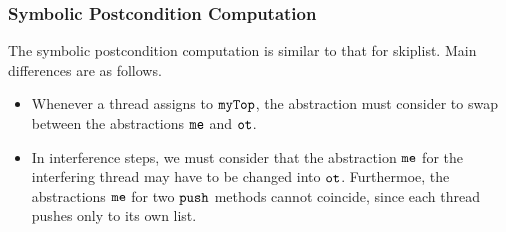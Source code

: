 



\subsubsection{Symbolic Postcondition Computation}
The symbolic postcondition computation is similar to that for skiplist.
Main differences are as follows.
\begin{itemize}
\item
  Whenever a thread assigns to $\tt myTop$, the abstraction must consider
  to swap between the abstractions $\tt me$ and $\tt ot$.
  \item
    In interference steps, we must consider that the abstraction
    $\tt me$ for the interfering thread may have to be changed into $\tt ot$.
    Furthermoe, the abstractions $\tt me$ for two $\tt push$ methods
    cannot coincide, since each thread pushes only to its own list.
\end{itemize}

